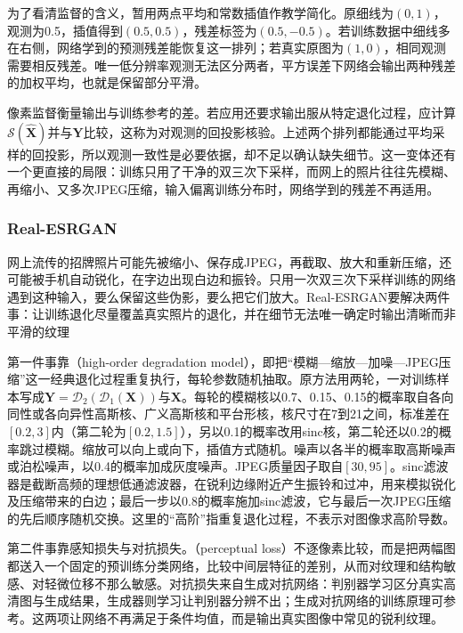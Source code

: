 为了看清监督的含义，暂用两点平均和常数插值作教学简化。原细线为$(0,1)$，观测为0.5，插值得到$(0.5,0.5)$，残差标签为$(0.5,-0.5)$。若训练数据中细线多在右侧，网络学到的预测残差能恢复这一排列；若真实原图为$(1,0)$，相同观测需要相反残差。唯一低分辨率观测无法区分两者，平方误差下网络会输出两种残差的加权平均，也就是保留部分平滑。

像素监督衡量输出与训练参考的差。若应用还要求输出服从特定退化过程，应计算$\mathcal{S}(\widehat{\bm{X}})$并与$\bm{Y}$比较，这称为对观测的回投影核验。上述两个排列都能通过平均采样的回投影，所以观测一致性是必要依据，却不足以确认缺失细节。这一变体还有一个更直接的局限：训练只用了干净的双三次下采样，而网上的照片往往先模糊、再缩小、又多次JPEG压缩，输入偏离训练分布时，网络学到的残差不再适用。

\subsubsection{Real-ESRGAN}
\label{sec:vision-restoration-real-esrgan}

网上流传的招牌照片可能先被缩小、保存成JPEG，再截取、放大和重新压缩，还可能被手机自动锐化，在字边出现白边和振铃。只用一次双三次下采样训练的网络遇到这种输入，要么保留这些伪影，要么把它们放大。Real-ESRGAN要解决两件事：让训练退化尽量覆盖真实照片的退化，并在细节无法唯一确定时输出清晰而非平滑的纹理

第一件事靠（high-order degradation model），即把“模糊—缩放—加噪—JPEG压缩”这一经典退化过程重复执行，每轮参数随机抽取。原方法用两轮，一对训练样本写成$\bm{Y}=\mathcal{D}_2(\mathcal{D}_1(\bm{X}))$与$\bm{X}$。每轮的模糊核以0.7、0.15、0.15的概率取自各向同性或各向异性高斯核、广义高斯核和平台形核，核尺寸在7到21之间，标准差在$[0.2,3]$内（第二轮为$[0.2,1.5]$），另以0.1的概率改用sinc核，第二轮还以0.2的概率跳过模糊。缩放可以向上或向下，插值方式随机。噪声以各半的概率取高斯噪声或泊松噪声，以0.4的概率加成灰度噪声。JPEG质量因子取自$[30,95]$。sinc滤波器是截断高频的理想低通滤波器，在锐利边缘附近产生振铃和过冲，用来模拟锐化及压缩带来的白边；最后一步以0.8的概率施加sinc滤波，它与最后一次JPEG压缩的先后顺序随机交换。这里的“高阶”指重复退化过程，不表示对图像求高阶导数。

第二件事靠感知损失与对抗损失。（perceptual loss）不逐像素比较，而是把两幅图都送入一个固定的预训练分类网络，比较中间层特征的差别，从而对纹理和结构敏感、对轻微位移不那么敏感。对抗损失来自生成对抗网络：判别器学习区分真实高清图与生成结果，生成器则学习让判别器分辨不出；生成对抗网络的训练原理可参考。这两项让网络不再满足于条件均值，而是输出真实图像中常见的锐利纹理。

